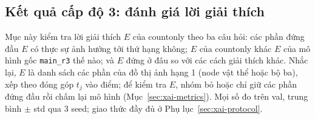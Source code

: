 \subsection{Kết quả cấp độ 3: đánh giá lời giải thích}
\label{sec:xai}

Mục này kiểm tra lời giải thích $E$ của countonly theo ba câu hỏi: các phần đứng đầu $E$ có thực sự ảnh hưởng tới thứ
hạng không; $E$ của countonly khác $E$ của mô hình gốc \texttt{main\_r3} thế nào; và $E$ đứng ở đâu so với các cách giải
thích khác. Nhắc lại, $E$ là danh sách các phần của đồ thị ảnh hạng 1 (node vật thể hoặc bộ ba), xếp theo đóng góp $t_j$ vào
điểm; để kiểm tra $E$, nhóm bỏ hoặc chỉ giữ các phần đứng đầu rồi chấm lại mô hình (Mục~\ref{sec:xai-metrics}). Mọi số đo
trên val, trung bình $\pm$ std qua 3 seed; giao thức đầy đủ ở Phụ lục~\ref{sec:xai-protocol}.

